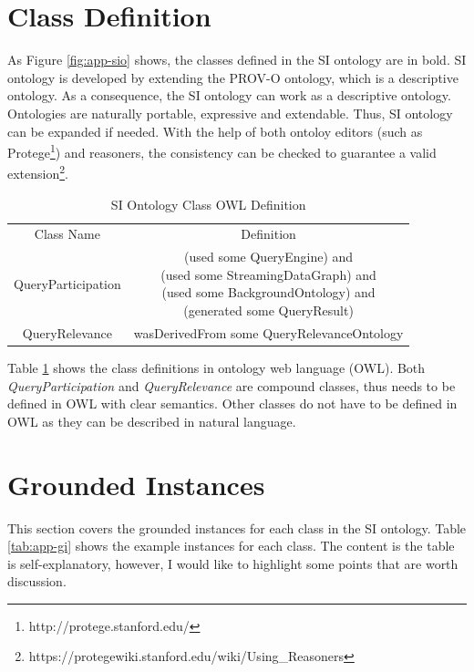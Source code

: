 %
\section{Class Definition}
As Figure \ref{fig:app-sio} shows, the classes defined in the SI ontology are in bold. 
SI ontology is developed by extending the PROV-O ontology, which is a descriptive ontology. 
As a consequence, the SI ontology can work as a descriptive ontology.
Ontologies are naturally portable, expressive and extendable. 
Thus, SI ontology can be expanded if needed.
With the help of both ontoloy editors (such as Protege\footnote{http://protege.stanford.edu/}) and reasoners, the consistency can be checked to guarantee a valid extension\footnote{https://protegewiki.stanford.edu/wiki/Using\_Reasoners}.

\begin{table}[!htbp]
    \centering
    \caption{SI Ontology Class OWL Definition}
    \begin{tabular}{|c||c|} \hline
         Class Name & Definition  \\ \hhline{|=#=|}
         QueryParticipation & \makecell{(used some QueryEngine) and \\ (used some StreamingDataGraph) and \\(used some BackgroundOntology) and \\(generated some QueryResult)} \\ \hline 
         QueryRelevance & wasDerivedFrom some QueryRelevanceOntology \\ \hline
    \end{tabular}
    \label{tab:app-socd}
\end{table}

Table \ref{tab:app-socd} shows the class definitions in ontology web language (OWL).
Both \textit{QueryParticipation} and \textit{QueryRelevance} are compound classes, thus needs to be defined in OWL with clear semantics. 
Other classes do not have to be defined in OWL as they can be described in natural language. 
%
\section{Grounded Instances}
This section covers the grounded instances for each class in the SI ontology.
Table \ref{tab:app-gi} shows the example instances for each class. 
The content is the table is self-explanatory, however, I would like to highlight some points that are worth discussion. 

